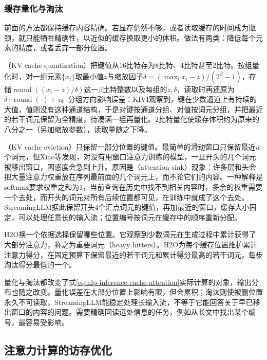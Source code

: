 \subsubsection{缓存量化与淘汰}
\label{sec:nlp-inference-cache-compression}

前面的方法都保持缓存内容精确。若显存仍然不够，或者读取缓存的时间成为瓶颈，就只能牺牲精确性，以近似的缓存换取更小的体积。做法有两类：降低每个元素的精度，或者丢弃一部分位置。

（KV cache quantization）把键值从16比特存为8比特、4比特甚至2比特。按组量化时，对一组元素$\{x_i\}$取最小值$z$与缩放因子$\delta=(\max_ix_i-z)/(2^{\beta}-1)$，存储$\operatorname{round}((x_i-z)/\delta)$这一$\beta$比特整数以及每组的$z,\delta$，读取时再还原为$\delta\cdot\operatorname{round}(\cdot)+z$。分组方向影响误差：KIVI观察到，键在少数通道上有持续的大值，值则没有这种通道结构，于是对键按通道分组、对值按词元分组，并把最近的若干词元保留为全精度，待凑满一组再量化。2比特量化使缓存体积约为原来的八分之一（另加缩放参数），读取量随之下降。

（KV cache eviction）只保留一部分位置的键值。最简单的滑动窗口只保留最近$w$个词元，但Xiao等发现，对没有用窗口注意力训练的模型，一旦开头的几个词元被移出窗口，困惑度会急剧上升。原因是（attention sink）现象：许多层和头会把大量注意力权重放在序列最前面的几个词元上，而不论它们的内容。一种解释是softmax要求权重之和为1，当前查询在历史中找不到相关内容时，多余的权重需要一个去处，而开头的词元对所有后续位置都可见，在训练中就成了这个去处。StreamingLLM据此保留开头4个汇点词元的键值，再加最近的窗口，缓存大小固定，可以处理任意长的输入流；位置编号按词元在缓存中的顺序重新分配。

H2O换一个依据选择保留哪些位置。它观察到少数词元在生成过程中累计获得了大部分注意力，称之为重要词元（heavy hitters）。H2O为每个缓存位置维护累计注意力得分，在固定预算下保留最近的若干词元和累计得分最高的若干词元，每步淘汰得分最低的一个。

量化与淘汰都改变了式\eqref{eq:nlp-inference-cache-attention}实际计算的对象，输出分布也随之改变。量化误差在大部分位置上影响有限，但会累积；淘汰则使被删位置永久不可读取，StreamingLLM能稳定处理长输入流，不等于它能回答关于早已移出窗口的内容的问题。需要精确回读远处信息的任务，例如从长文中找出某个编号，最容易受影响。

\subsection{注意力计算的访存优化}
\label{sec:nlp-inference-flash}

